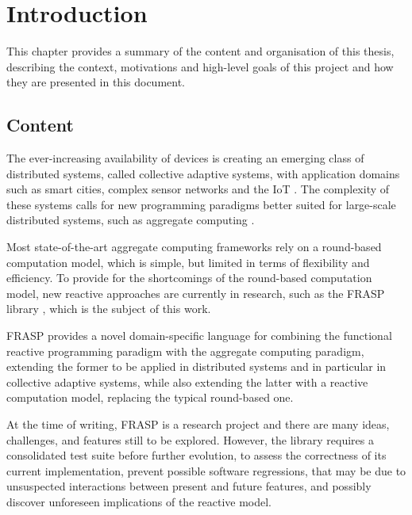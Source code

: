 
\chapter{Introduction}
\label{chapter:introduction}

This chapter provides a summary of the content and organisation of this thesis,
describing the context, motivations and high-level goals of this project and
how they are presented in this document.

\section{Content}
\label{section:introduction:content}

The ever-increasing availability of devices is creating an emerging class of
distributed systems, called collective adaptive systems, with application
domains such as smart cities, complex sensor networks and the \ac{IoT}
\cite{CAS-AggregateComputingBlocks}. The complexity of these systems calls for
new programming paradigms better suited for large-scale distributed systems,
such as aggregate computing \cite{FieldCalculus-AggregateComputing}.

Most state-of-the-art aggregate computing frameworks rely on a round-based
computation model, which is simple, but limited in terms of flexibility and
efficiency. To provide for the shortcomings of the round-based computation
model, new reactive approaches are currently in research, such as the FRASP
library \cite{FRASP}, which is the subject of this work.

FRASP provides a novel domain-specific language for combining the functional
reactive programming paradigm with the aggregate computing paradigm, extending
the former to be applied in distributed systems and in particular in collective
adaptive systems, while also extending the latter with a reactive computation
model, replacing the typical round-based one.

At the time of writing, FRASP is a research project and there are many ideas,
challenges, and features still to be explored. However, the library requires a
consolidated test suite before further evolution, to assess the correctness of
its current implementation, prevent possible software regressions, that may be
due to unsuspected interactions between present and future features, and
possibly discover unforeseen implications of the reactive model.

